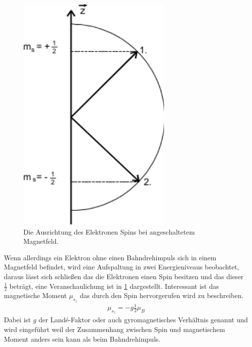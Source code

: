 \begin{figure}
	\centering
	\includegraphics[width=\textwidth/4]{../Grafiken/SpinElektron.pdf}
	\caption{Die Ausrichtung des Elektronen Spins bei angeschaltetem Magnetfeld.\cite{V28}}\label{fig:ResonanzTheo}
\end{figure}
Wenn allerdings ein Elektron ohne einen Bahndrehimpuls sich in einem Magnetfeld befindet, wird eine Aufspaltung in zwei Energieniveaus beobachtet, daraus lässt sich schließen das die Elektronen einen Spin besitzen und das dieser $\frac{1}{2}$ beträgt, eine Veranschaulichung ist in \cref{fig:ResonanzTheo} dargestellt.
Interessant ist das magnetische Moment $\mu_{s_z}$ das durch den Spin hervorgerufen wird zu beschreiben.
\begin{align}
	\mu_{s_z}=-g\frac{1}{2}\mu_B\label{eq:musz}
\end{align}
Dabei ist $g$ der Landé-Faktor oder auch gyromagnetisches  Verhältnis genannt und wird eingeführt weil der Zusammenhang zwischen Spin und magnetischem Moment anders sein kann als beim Bahndrehimpuls.

